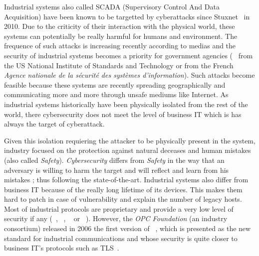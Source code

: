 
Industrial systems also called SCADA (Supervisory Control And Data Acquisition)
have been known to be targetted by cyberattacks since Stuxnet~\cite{Lan11} in
2010.
Due to the criticity of their interaction with the physical world, these systems
can potentially be really harmful for humans and environment.
The frequence of such attacks is increasing recently according to medias and
the security of industrial systems becomes a priority for government agencies
(\eg~\cite{SFS11} from the US National Institute of Standards and Technology or
\cite{ANSSI12_guide_securite_industrielle_en} from the French {\em Agence
nationale de la sécurité des systèmes d'information}).
Such attacks become feasible because these systems are recently spreading
geographically and communicating more and more through unsafe mediums like
Internet.
As industrial systems historically have been physically isolated from the rest
of the world, there cybersecurity does not meet the level of business IT which
is has always the target of cyberattack.

Given this isolation requiering the attacker to be physically present in the
system, industry focused on the protection against natural deceases and human
mistakes (also called {\em Safety}).
{\em Cybersecurity} differs from {\em Safety} in the way that an adversary is
willing to harm the target and will reflect and learn from his mistakes ; thus
following the state-of-the-art.
Industrial systems also differ from business IT because of the really long
lifetime of its devices.
This makes them hard to patch in case of vulnerability and explain the number of
legacy hosts.
Most of industrial protocols are proprietary and provide a very low level of
security if any (\eg \modbus~\cite{MODBUS}, \profinet~\cite{PROFINET}, \etherip~\cite{Bro01} or
\dnp~\cite{CR04}).
However, the {\em OPC Foundation} (an industry consortium) released in 2006 the
first version of \opcua~\cite{MLD09}, which is presented as the new standard for
industrial communications and whose security is quite closer to business IT's
protocols such as TLS~\cite{DR08}.

